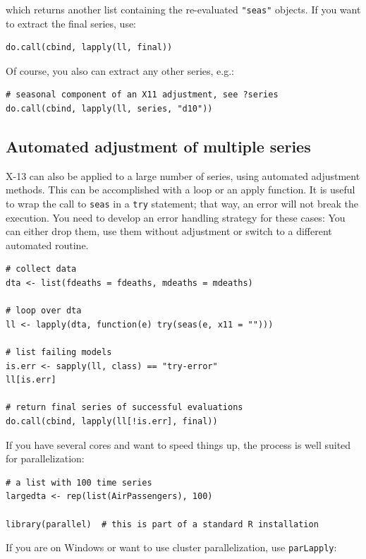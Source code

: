 which returns another list containing the re-evaluated \texttt{"seas"}
objects. If you want to extract the final series, use:

\begin{verbatim}
do.call(cbind, lapply(ll, final))
\end{verbatim}

Of course, you also can extract any other series, e.g.:

\begin{verbatim}
# seasonal component of an X11 adjustment, see ?series
do.call(cbind, lapply(ll, series, "d10"))
\end{verbatim}

\subsection{Automated adjustment of multiple
series}\label{automated-adjustment-of-multiple-series}

X-13 can also be applied to a large number of series, using automated
adjustment methods. This can be accomplished with a loop or an apply
function. It is useful to wrap the call to \texttt{seas} in a
\texttt{try} statement; that way, an error will not break the execution.
You need to develop an error handling strategy for these cases: You can
either drop them, use them without adjustment or switch to a different
automated routine.

\begin{verbatim}
# collect data 
dta <- list(fdeaths = fdeaths, mdeaths = mdeaths)

# loop over dta
ll <- lapply(dta, function(e) try(seas(e, x11 = "")))

# list failing models
is.err <- sapply(ll, class) == "try-error"
ll[is.err]

# return final series of successful evaluations
do.call(cbind, lapply(ll[!is.err], final))
\end{verbatim}

If you have several cores and want to speed things up, the process is
well suited for parallelization:

\begin{verbatim}
# a list with 100 time series
largedta <- rep(list(AirPassengers), 100)

library(parallel)  # this is part of a standard R installation
\end{verbatim}

If you are on Windows or want to use cluster parallelization, use
\texttt{parLapply}:

